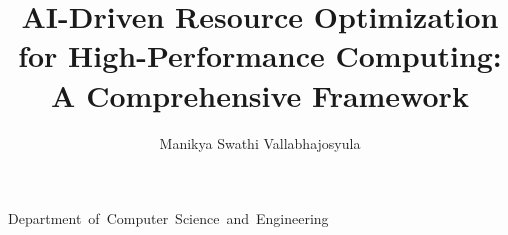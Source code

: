 \documentclass{osudissert96}
\begin{document}
%
%

\author{Manikya Swathi Vallabhajosyula}
\title{AI-Driven Resource Optimization for High-Performance Computing: A Comprehensive Framework }
\unit{Department of Computer Science and Engineering}



%
%

\maketitle

%
%
%
%
%

\disscopyright

%
%

\begin{abstract}
  
\end{abstract}


%
%
%
\end{document}
